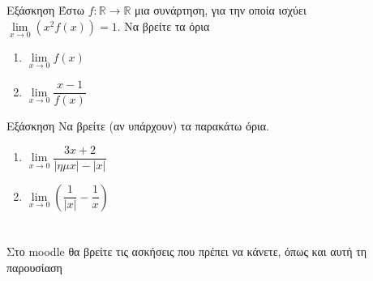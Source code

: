 \documentclass[greek]{beamer}
\begin{document}
\begin{frame}{Εξάσκηση}
  Έστω $f:\mathbb{R}\to\mathbb{R}$ μια συνάρτηση, για την οποία ισχύει $\lim\limits_{x \to 0}{ \left( x^2f(x)  \right)  }=1$.
  Να βρείτε τα όρια
  \begin{enumerate}
    \item $\lim\limits_{x \to 0}{ f(x) }$ \pause
    \item $\lim\limits_{x \to 0}{ \dfrac{x-1}{f(x)} }$
  \end{enumerate}
\end{frame}

\begin{frame}{Εξάσκηση}
  Να βρείτε (αν υπάρχουν) τα παρακάτω όρια.
  \begin{enumerate}
    \item $\lim\limits_{x \to 0}{ \dfrac{3x+2}{|ημx|-|x|} }$ \pause
    \item $\lim\limits_{x \to 0}{ \left( \dfrac{1}{|x|}-\dfrac{1}{x}  \right)  }$
  \end{enumerate}
\end{frame}

\section{}
\begin{frame}
  Στο moodle θα βρείτε τις ασκήσεις που πρέπει να κάνετε, όπως και αυτή τη παρουσίαση
\end{frame}
\end{document}
